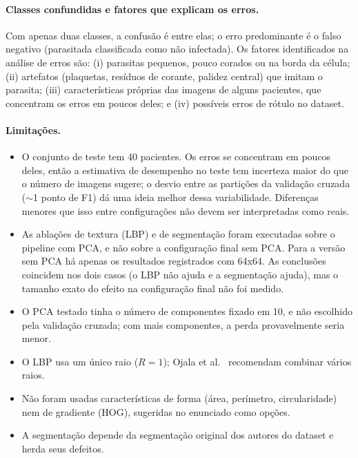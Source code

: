 \documentclass[11pt,a4paper]{article}
\begin{document}
\paragraph{Classes confundidas e fatores que explicam os erros.} Com apenas duas classes, a confusão é
entre elas; o erro predominante é o falso negativo (parasitada classificada como não infectada). Os
fatores identificados na análise de erros são: (i) parasitas pequenos, pouco corados ou na borda da
célula; (ii) artefatos (plaquetas, resíduos de corante, palidez central) que imitam o parasita;
(iii) características próprias das imagens de alguns pacientes, que concentram os erros em poucos
deles; e (iv) possíveis erros de rótulo no dataset.

\paragraph{Limitações.}
\begin{itemize}
  \item O conjunto de teste tem 40 pacientes. Os erros se concentram em poucos deles, então a
        estimativa de desempenho no teste tem incerteza maior do que o número de imagens sugere;
        o desvio entre as partições da validação cruzada ($\sim$1 ponto de F1) dá uma ideia melhor
        dessa variabilidade. Diferenças menores que isso entre configurações não devem ser
        interpretadas como reais.
  \item As ablações de textura (LBP) e de segmentação foram executadas sobre o pipeline com PCA, e
        não sobre a configuração final sem PCA. Para a versão sem PCA há apenas os resultados
        registrados com 64x64. As conclusões coincidem nos dois casos (o LBP não ajuda e a
        segmentação ajuda), mas o tamanho exato do efeito na configuração final não foi medido.
  \item O PCA testado tinha o número de componentes fixado em 10, e não escolhido pela validação
        cruzada; com mais componentes, a perda provavelmente seria menor.
  \item O LBP usa um único raio ($R=1$); Ojala et al.~\cite{ojala2002} recomendam combinar vários raios.
  \item Não foram usadas características de forma (área, perímetro, circularidade) nem de gradiente
        (HOG), sugeridas no enunciado como opções.
  \item A segmentação depende da segmentação original dos autores do dataset e herda seus defeitos.
\end{itemize}
\end{document}
